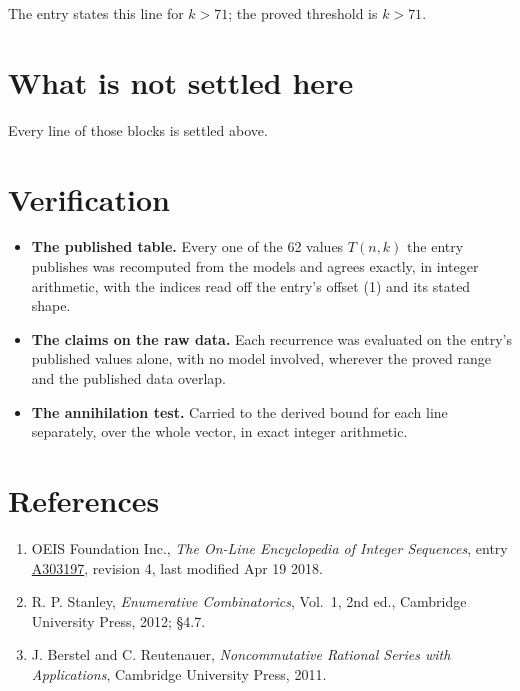 \documentclass[11pt]{article}
\theoremstyle{definition}
\begin{document}
The entry states this line for $k > 71$; the proved threshold is $k > 71$.

\section{What is not settled here}

Every line of those blocks is settled above.

\section{Verification}

\begin{itemize}

\item {\bfseries The published table.} Every one of the 62 values $T(n,k)$ the entry publishes was recomputed from the models and agrees exactly, in integer arithmetic, with the indices read off the entry's offset (1) and its stated shape.

\item {\bfseries The claims on the raw data.} Each recurrence was evaluated on the entry's published values alone, with no model involved, wherever the proved range and the published data overlap.

\item {\bfseries The annihilation test.} Carried to the derived bound for each line separately, over the whole vector, in exact integer arithmetic.

\end{itemize}

\section{References}

\begin{enumerate}

\item OEIS Foundation Inc., \emph{The On-Line Encyclopedia of Integer Sequences}, entry \href{https://oeis.org/A303197}{A303197}, revision 4, last modified Apr 19 2018.

\item R. P. Stanley, \emph{Enumerative Combinatorics}, Vol.~1, 2nd ed., Cambridge University Press, 2012; \S4.7.

\item J. Berstel and C. Reutenauer, \emph{Noncommutative Rational Series with Applications}, Cambridge University Press, 2011.

\end{enumerate}
\end{document}
